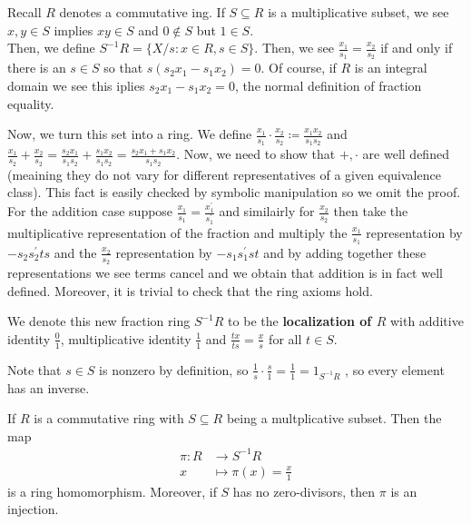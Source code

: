 \begin{recall}
	Recall \(R\) denotes a commutative ing. If \(S \subseteq R\) is a multiplicative subset, we see \(x, y \in S\) implies \(xy\in S\) and \(0 \not\in S\) but \(1 \in S\).\\
	Then, we define \(S^{-1} R = \{X / s : x\in R, s \in S\} \). Then, we see \(\frac{x_1}{s_1} = \frac{x_2}{s_2}\) if and only if there is an \(s \in S\) so that \(s\left( s_2 x_1 - s_1 x_2 \right) = 0\). Of course, if \(R\) is an integral domain we see this iplies \(s_2 x_1 - s_1 x_2 = 0\), the normal definition of fraction equality.
\end{recall}
Now, we turn this set into a ring. We define \(\frac{x_1}{s_1}\cdot \frac{x_2}{s_2} \coloneqq \frac{x_1x_2}{s_1s_2}\) and \(\frac{x_1}{s_2} + \frac{x_2}{s_2} = \frac{s_2x_1}{s_1s_2} + \frac{s_1 x_2}{s_1 s_2} = \frac{s_2x_1 + s_1x_2}{s_1 s_2}\). Now, we need to show that \(+, \cdot\) are well defined (meaining they do not vary for different representatives of a given equivalence class). This fact is easily checked by symbolic manipulation so we omit the proof. For the addition case suppose \(\frac{x_1}{s_1} = \frac{x_1^{\prime}}{s_1^{\prime}}\) and similairly for \(\frac{x_2}{s_2}\) then take the multiplicative representation of the fraction and multiply the \(\frac{x_1}{s_1}\) representation by \(-s_2 s_2^{\prime} t s\) and the \(\frac{x_2}{s_2}\) representation by \(-s_1 s_1^{\prime} s t\) and by adding together these representations we see terms cancel and we obtain that addition is in fact well defined. Moreover, it is trivial to check that the ring axioms hold.
\begin{definition}
We denote this new fraction ring \(S^{-1} R\) to be the \textbf{localization of \(R\) } with additive identity \(\frac{0}{1}\), multiplicative identity \(\frac{1}{1}\) and \(\frac{tx}{ts}= \frac{x}{s}\) for all \(t \in S\).
\end{definition}
Note that \(s \in S\) is nonzero by definition, so \(\frac{1}{s} \cdot \frac{s}{1} = \frac{1}{1} = 1_{S^{-1} R}\) , so every element has an inverse.
\begin{proposition}
	If \(R\) is a commutative ring with \(S \subseteq R\) being a multplicative subset. Then the map \begin{align*}
		\pi: R &\longrightarrow S^{-1}R \\
		x &\longmapsto \pi(x) = \frac{x}{1}
	\end{align*} is a ring homomorphism. Moreover, if \(S\) has no zero-divisors, then \(\pi\) is an injection.
\end{proposition}
